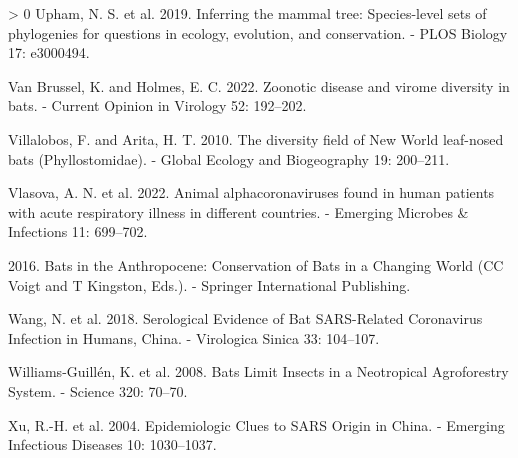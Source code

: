 \documentclass[11pt]{article}
\newlength{\cslhangindent}
\newenvironment{CSLReferences}[3] %
 {%
  \setlength{\parindent}{0pt}
  \ifodd #1 \everypar{\setlength{\hangindent}{\cslhangindent}}\ignorespaces\fi
  \ifnum #2 > 0
  \setlength{\parskip}{#2\baselineskip}
  \fi
 }%
 {}
\begin{document}
\begin{CSLReferences}{1}{0}
\leavevmode\hypertarget{ref-Upham2019InfMam}{}%
Upham, N. S. et al. 2019. Inferring the mammal tree: Species-level sets
of phylogenies for questions in ecology, evolution, and conservation. -
PLOS Biology 17: e3000494.

\leavevmode\hypertarget{ref-VanBrussel2022ZooDis}{}%
Van Brussel, K. and Holmes, E. C. 2022. Zoonotic disease and virome
diversity in bats. - Current Opinion in Virology 52: 192--202.

\leavevmode\hypertarget{ref-Villalobos2010DivFie}{}%
Villalobos, F. and Arita, H. T. 2010. The diversity field of New World
leaf-nosed bats (Phyllostomidae). - Global Ecology and Biogeography 19:
200--211.

\leavevmode\hypertarget{ref-Vlasova2022AniAlp}{}%
Vlasova, A. N. et al. 2022. Animal alphacoronaviruses found in human
patients with acute respiratory illness in different countries. -
Emerging Microbes \& Infections 11: 699--702.

\leavevmode\hypertarget{ref-Voigt2016BatAnt}{}%
2016. Bats in the Anthropocene: Conservation of Bats in a Changing World
(CC Voigt and T Kingston, Eds.). - Springer International Publishing.

\leavevmode\hypertarget{ref-Wang2018SerEvi}{}%
Wang, N. et al. 2018. Serological Evidence of Bat SARS-Related
Coronavirus Infection in Humans, China. - Virologica Sinica 33:
104--107.

\leavevmode\hypertarget{ref-Williams-Guillen2008BatLim}{}%
Williams-Guillén, K. et al. 2008. Bats Limit Insects in a Neotropical
Agroforestry System. - Science 320: 70--70.

\leavevmode\hypertarget{ref-Xu2004EpiClu}{}%
Xu, R.-H. et al. 2004. Epidemiologic Clues to SARS Origin in China. -
Emerging Infectious Diseases 10: 1030--1037.

\end{CSLReferences}
\end{document}
